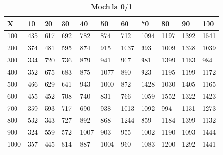 \documentclass[10pt,letterpaper]{article}
\begin{document}
\newpage 
{}
\begin{center}
\begin{table}\renewcommand{\arraystretch}{2.5}
\caption{\large \textbf{Mochila 0/1}}
\centering
\begin{tabular} { |m{0.5cm}|m{1.3cm}|m{1.3cm}|m{1.3cm}|m{1.3cm}|m{1.3cm}|m{1.3cm}|m{1.3cm}|m{1.3cm}|m{1.3cm}|m{1.3cm}|} 
\hline
\rowcolor{Gray}
\centering \textbf{X} & \centering \textbf{10} & \centering \textbf{20} & \centering \textbf{30}\ & \centering \textbf{40} & \centering \textbf{50} & \centering \textbf{60}\ & \centering \textbf{70} & \centering \textbf{80} & \centering \textbf{90}\ & \textbf{100} \\\hline
\cellcolor{Gray}100 & \Large 435 & \Large 617 & \Large 692 & \Large 782 & \Large 874 & \Large 712 & \Large 1094 & \Large 1197 & \Large 1392 & \Large 1541 \\
\hline
\cellcolor{Gray}200 & \Large 374 & \Large 481 & \Large 595 & \Large 874 & \Large 915 & \Large 1037 & \Large 993 & \Large 1009 & \Large 1328 & \Large 1039 \\
\hline
\cellcolor{Gray}300 & \Large 334 & \Large 720 & \Large 736 & \Large 879 & \Large 941 & \Large 907 & \Large 981 & \Large 1399 & \Large 1183 & \Large 984 \\
\hline
\cellcolor{Gray}400 & \Large 352 & \Large 675 & \Large 683 & \Large 875 & \Large 1077 & \Large 890 & \Large 923 & \Large 1195 & \Large 1199 & \Large 1172 \\
\hline
\cellcolor{Gray}500 & \Large 466 & \Large 629 & \Large 641 & \Large 943 & \Large 1000 & \Large 872 & \Large 1428 & \Large 1030 & \Large 1405 & \Large 1165 \\
\hline
\cellcolor{Gray}600 & \Large 455 & \Large 452 & \Large 708 & \Large 740 & \Large 831 & \Large 766 & \Large 1059 & \Large 1552 & \Large 1322 & \Large 1423 \\
\hline
\cellcolor{Gray}700 & \Large 359 & \Large 593 & \Large 717 & \Large 690 & \Large 938 & \Large 1013 & \Large 1092 & \Large 994 & \Large 1131 & \Large 1273 \\
\hline
\cellcolor{Gray}800 & \Large 532 & \Large 343 & \Large 727 & \Large 892 & \Large 868 & \Large 1244 & \Large 859 & \Large 1184 & \Large 1399 & \Large 1132 \\
\hline
\cellcolor{Gray}900 & \Large 324 & \Large 559 & \Large 572 & \Large 1007 & \Large 903 & \Large 955 & \Large 1002 & \Large 1190 & \Large 1093 & \Large 1444 \\
\hline
\cellcolor{Gray}1000 & \Large 357 & \Large 445 & \Large 814 & \Large 887 & \Large 1004 & \Large 960 & \Large 1083 & \Large 1200 & \Large 1292 & \Large 1441 \\
\hline
\end{tabular} \\
\end{table}
\end{center}
\end{document}
